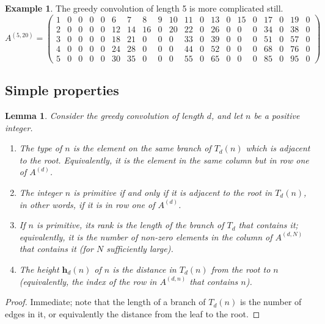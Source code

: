 \documentclass[12pt]{article}
\theoremstyle{definition}
\newtheorem{mexample}{Example}
\theoremstyle{remark}
\theoremstyle{plain}
\newtheorem{lemma}{Lemma}
\newcommand{\height}[2]{\mathbf{h}_{#1}(#2)}
\begin{document}
\begin{mexample}
The greedy convolution of length 5 is more complicated still.
\begin{displaymath}
A^{(5,20)} =
\left(\begin{array}{rrrrrrrrrrrrrrrrrrrr}
1 & 0 & 0 & 0 & 0 & 6 & 7 & 8 & 9 & 10 & 11 & 0 & 13 & 0 & 15 & 0 & 17 & 0 & 19 & 0 \\
2 & 0 & 0 & 0 & 0 & 12 & 14 & 16 & 0 & 20 & 22 & 0 & 26 & 0 & 0 & 0 & 34 & 0 & 38 & 0 \\
3 & 0 & 0 & 0 & 0 & 18 & 21 & 0 & 0 & 0 & 33 & 0 & 39 & 0 & 0 & 0 & 51 & 0 & 57 & 0 \\
4 & 0 & 0 & 0 & 0 & 24 & 28 & 0 & 0 & 0 & 44 & 0 & 52 & 0 & 0 & 0 & 68 & 0 & 76 & 0 \\
5 & 0 & 0 & 0 & 0 & 30 & 35 & 0 & 0 & 0 & 55 & 0 & 65 & 0 & 0 & 0 & 85 & 0 & 95 & 0
\end{array}\right)
\end{displaymath}
\end{mexample}
\subsection{Simple properties}
\label{sec:org3b7ff7e}

\begin{lemma}
Consider the greedy convolution of length \(d\), and let \(n\) be a positive integer.
\begin{enumerate}[label={(\roman*)}]
\item The type of \(n\) is the element on the same branch of \(T_{d}(n)\) which is adjacent to the root. Equivalently, it is the
element in the same column but in row one of \(A^{(d)}\).
\item The integer \(n\) is primitive if and only if it is adjacent to the root in \(T_{d}(n)\), in other words,
if it is in row one of \(A^{(d)}\).
\item If \(n\) is primitive, its rank is the length of the branch of \(T_{d}\) that contains it; equivalently,
it is the number of non-zero elements in the column of \(A^{(d,N)}\) that contains it (for \(N\) sufficiently large).
\item The height \(\height{d}{n}\) of \(n\) is the distance in \(T_{d}(n)\) from  the root to \(n\) (equivalently,
the index of the row in \(A^{(d,n)}\) that contains \(n\)).
\end{enumerate}
\label{org5efffdc}
\end{lemma}
\begin{proof}
Immediate; note that the length of a branch of \(T_{d}(n)\) is the number of edges in it, or equivalently the
distance from the leaf to the root.
\end{proof}
\end{document}

